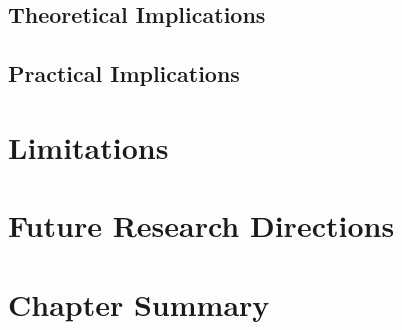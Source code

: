 \subsection{Theoretical Implications}

\subsection{Practical Implications}

\section{Limitations}

\section{Future Research Directions}

\section{Chapter Summary}
